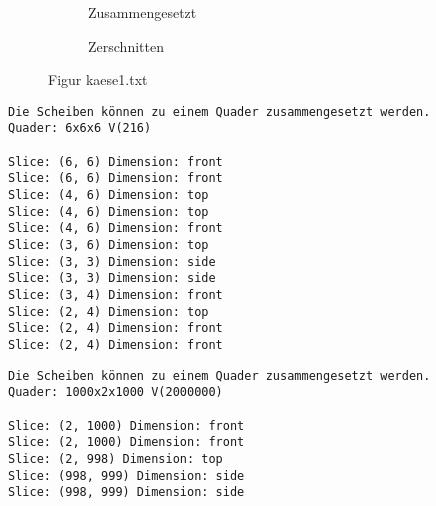 \documentclass[a4paper,10pt,ngerman]{scrartcl}
\newcommand{\simplecube}[8]%
{
    \begin{scope}[shift={#1}]
        \fill[gray!40,canvas is yz plane at x=#2, opacity=#8] (0,0) rectangle (#3,#4);
        \fill[gray!10,canvas is xz plane at y=#3, opacity=#8] (0,0) rectangle (#2,#4);
        \fill[white  ,canvas is xy plane at z=#4, opacity=#8] (0,0) rectangle (#2,#3);
        \foreach\i/\j in {0/1, 1/1, 1/0}
            {
            \draw[line#5] (0,#3*\i,#4*\j) --++ (#2,0,0);
            \draw[line#6] (#2*\i,0,#4*\j) --++ (0,#3,0);
            \draw[line#7] (#2*\i,#3*\j,0) --++ (0,0,#4);
        }
    \end{scope}
}
\newcommand{\bigSquare}[4]%
{
    \begin{scope}[shift={#1}]
        \simplecube{(0,     0,      0)}     {1}{4}{2}   {a}{a}{a}   {1}
        \simplecube{(1+#4,   0,      0))}    {1}{4}{2}   {a}{a}{a}   {1}
        \simplecube{(0,     0,      2+#4)}   {2}{4}{1}   {a}{a}{a}   {1}
        \simplecube{(2+2*#4,   0,      0)}     {1}{4}{3}   {a}{a}{a}   {0.8}
        \simplecube{(0,     4+#4,    0)}     {3}{1}{3}   {a}{a}{a}   {0.8}
        \simplecube{(0,     5+2*#4,    0)}     {3}{1}{3}   {a}{a}{a}   {0.5}
        \simplecube{(0,     0,      3+2*#4)}   {3}{6}{1}   {a}{a}{a}   {0.8}
        \simplecube{(3+3*#4,   0,      0))}    {1}{6}{4}   {a}{a}{a}   {0.5}
        \simplecube{(0,     0,      4+3*#4)}   {4}{6}{1}   {a}{a}{a}   {0.5}
        \simplecube{(0,     0,      5+4*#4)}   {4}{6}{1}   {a}{a}{a}   {0.2}
        \simplecube{(4+4*#4,   0,      0))}    {1}{6}{6}   {a}{a}{a}   {0.2}
        \simplecube{(5+5*#4,   0,      0))}    {1}{6}{6}   {a}{a}{a}   {0}
    \end{scope}
}
\begin{document}
    \begin{figure}[H]
        \centering
        \def\a{3.2}
        \def\b{1.2}
        \begin{subfigure}[b]{0.45\textwidth}
            \centering %
            \caption{Zusammengesetzt}\label{fig:figA1}
        \end{subfigure}
        \begin{subfigure}[b]{0.45\textwidth}
            \centering %
            \caption{Zerschnitten}\label{fig:figB1}
        \end{subfigure}
        \caption{Figur kaese1.txt}\label{fig:figAB1}
    \end{figure}

    \begin{lstlisting}[frame=single, title=Programmausgabe kaese1.txt, breaklines=true,label={lst:lstlisting2}]
    Die Scheiben können zu einem Quader zusammengesetzt werden.
Quader: 6x6x6 V(216)

Slice: (6, 6) Dimension: front
Slice: (6, 6) Dimension: front
Slice: (4, 6) Dimension: top
Slice: (4, 6) Dimension: top
Slice: (4, 6) Dimension: front
Slice: (3, 6) Dimension: top
Slice: (3, 3) Dimension: side
Slice: (3, 3) Dimension: side
Slice: (3, 4) Dimension: front
Slice: (2, 4) Dimension: top
Slice: (2, 4) Dimension: front
Slice: (2, 4) Dimension: front

    \end{lstlisting}

    \begin{lstlisting}[frame=single, title=Programmausgabe kaese2.txt, breaklines=true,label={lst:lstlisting2}]
Die Scheiben können zu einem Quader zusammengesetzt werden.
Quader: 1000x2x1000 V(2000000)

Slice: (2, 1000) Dimension: front
Slice: (2, 1000) Dimension: front
Slice: (2, 998) Dimension: top
Slice: (998, 999) Dimension: side
Slice: (998, 999) Dimension: side

    \end{lstlisting}
\end{document}
